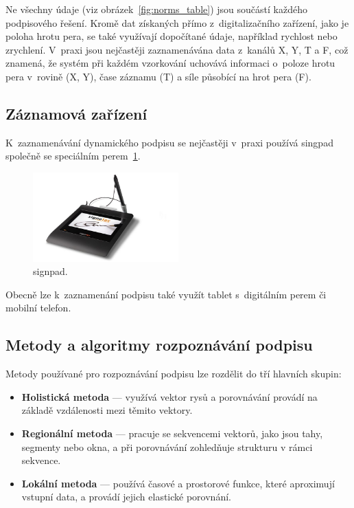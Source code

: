 Ne všechny údaje (viz obrázek~\ref{fig:norms_table}) jsou součástí každého podpisového řešení. 
Kromě dat získaných přímo z~digitalizačního zařízení, jako je poloha hrotu pera, se také využívají dopočítané údaje, například rychlost nebo zrychlení. 
V~praxi jsou nejčastěji zaznamenávána data z~kanálů X, Y, T a F, což znamená, že systém při každém vzorkování uchovává informaci o~poloze hrotu pera v~rovině (X, Y), čase záznamu (T) a síle působící na hrot pera (F).~\cite{DSM2021b}

\subsection*{Záznamová zařízení}
K~zaznamenávání dynamického podpisu se nejčastěji v~praxi používá singpad společně se speciálním perem~\ref{fig:signpad}.

\begin{figure}[h]
  \centering
  \includegraphics[width=0.5\textwidth]{obrazky-figures/signpad.jpg}
  \caption{signpad.~\cite{SignPadImage}} %
  \label{fig:signpad}
\end{figure}

Obecně lze k~zaznamenání podpisu také využít tablet s~digitálním perem či mobilní telefon.

\subsection*{Metody a algoritmy rozpoznávání podpisu}
Metody používané pro rozpoznávání podpisu lze rozdělit do tří hlavních skupin:
\begin{itemize}
  \item \textbf{Holistická metoda} --- využívá vektor rysů a porovnávání provádí na základě vzdálenosti mezi těmito vektory.
  \item \textbf{Regionální metoda} --- pracuje se sekvencemi vektorů, jako jsou tahy, segmenty nebo okna, a při porovnávání zohledňuje strukturu v rámci sekvence.
  \item \textbf{Lokální metoda} --- používá časové a prostorové funkce, které aproximují vstupní data, a provádí jejich elastické porovnání.
\end{itemize}

